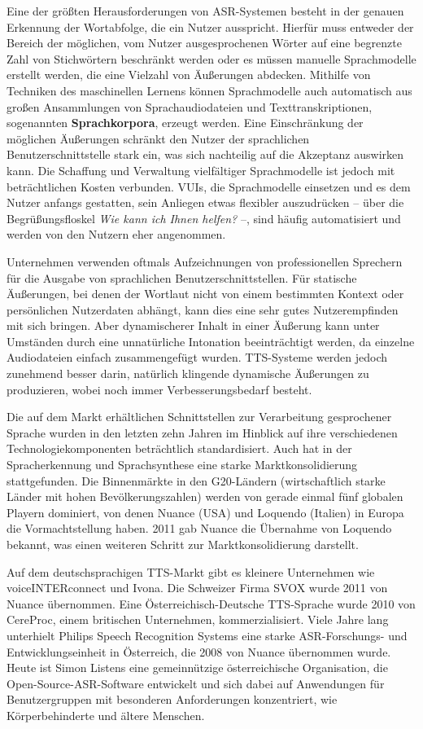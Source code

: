 \documentclass[]{../../metanetpaper}
\begin{document}
\begin{Parallel}[c]{79mm}{78mm}
{Eine der größten Herausforderungen von ASR-Syste\-men besteht in der genauen Erkennung der Wortabfolge, die ein Nutzer ausspricht. Hierfür muss entweder der Bereich der möglichen, vom Nutzer ausgesprochenen Wörter auf eine begrenzte Zahl von Stichwörtern beschränkt werden oder es müssen manuelle  Sprachmodelle erstellt werden, die eine Vielzahl von Äußerungen abdecken. Mithilfe von Techniken des maschinellen Lernens können Sprachmodelle auch automatisch aus großen Ansammlungen von Sprachaudiodateien und Texttranskriptionen, sogenannten \textbf{Sprachkorpora}, erzeugt werden. Eine Einschränkung der möglichen Äußerungen schränkt den Nutzer der sprachlichen Benutzerschnittstelle stark ein, was sich nachteilig auf die Akzeptanz auswirken kann. Die Schaffung und Verwaltung vielfältiger Sprachmodelle ist jedoch mit beträchtlichen Kosten verbunden. VUIs, die Sprachmodelle einsetzen und es dem Nutzer anfangs gestatten, sein Anliegen etwas flexibler auszudrücken -- über die Begrüßungsfloskel \textit{Wie kann ich Ihnen helfen?} --, sind häufig automatisiert und werden von den Nutzern eher angenommen. 

Unternehmen verwenden oftmals Aufzeichnungen von professionellen Sprechern für die Ausgabe von sprachlichen Benutzerschnittstellen. Für statische Äußerungen, bei denen der Wortlaut nicht von einem bestimmten Kontext oder persönlichen Nutzerdaten abhängt, kann dies eine sehr gutes Nutzerempfinden mit sich bringen. Aber dynamischerer Inhalt in einer Äußerung kann unter Umständen durch eine unnatürliche Intonation beeinträchtigt werden, da einzelne Audiodateien einfach zusammengefügt wurden. TTS-Systeme werden jedoch zunehmend besser darin, natürlich klingende dynamische Äußerungen zu produzieren, wobei noch immer Verbesserungsbedarf besteht. 

Die auf dem Markt erhältlichen Schnittstellen zur Verarbeitung gesprochener Sprache wurden in den letzten zehn Jahren im Hinblick auf ihre verschiedenen Technologiekomponenten beträchtlich standardisiert. Auch hat in der Spracherkennung und Sprachsynthese eine starke Marktkonsolidierung stattgefunden. Die Binnenmärkte in den G20-Ländern (wirtschaftlich starke Länder mit hohen Bevölkerungszahlen) werden von gerade einmal fünf globalen Playern dominiert, von denen Nuance (USA) und Loquendo (Italien) in Europa die Vormachtstellung haben. 2011 gab Nuance die Übernahme von Loquendo bekannt, was einen weiteren Schritt zur Marktkonsolidierung darstellt.

Auf dem deutschsprachigen TTS-Markt gibt es kleinere Unternehmen wie voiceINTERconnect und Ivona. Die Schweizer Firma SVOX wurde 2011 von Nuance übernommen. Eine Österreichisch-Deutsche TTS-Sprache wurde 2010 von CereProc, einem britischen Unternehmen, kommerzialisiert. Viele Jahre lang unterhielt Philips Speech Recognition Systems eine starke ASR-Forschungs- und Entwicklungseinheit in Österreich, die 2008 von Nuance übernommen wurde. Heute ist Simon Listens eine gemeinnützige österreichische Organisation, die Open-Source-ASR-Software entwickelt und sich dabei auf Anwendungen für Benutzergruppen mit besonderen Anforderungen konzentriert, wie Körperbehinderte und ältere Menschen.

}
\end{Parallel}
\end{document}
